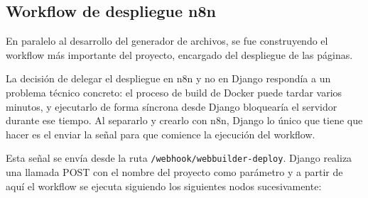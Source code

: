 \subsection{Workflow de despliegue n8n}
\label{subsec:workflow-despliegue}

En paralelo al desarrollo del generador de archivos, se fue construyendo el workflow más importante del proyecto, encargado del despliegue de las páginas.

La decisión de delegar el despliegue en n8n y no en Django respondía 
a un problema técnico concreto: el proceso de build de Docker puede 
tardar varios minutos, y ejecutarlo de forma síncrona desde Django 
bloquearía el servidor durante ese tiempo. Al separarlo y crearlo con n8n, Django lo único que tiene que hacer es el enviar la señal para que comience la ejecución del workflow.

Esta señal se envía desde la ruta \texttt{/webhook/webbuilder-deploy}. Django realiza una llamada POST con el nombre del proyecto como parámetro y a partir de aquí el workflow se ejecuta siguiendo los siguientes nodos sucesivamente:

